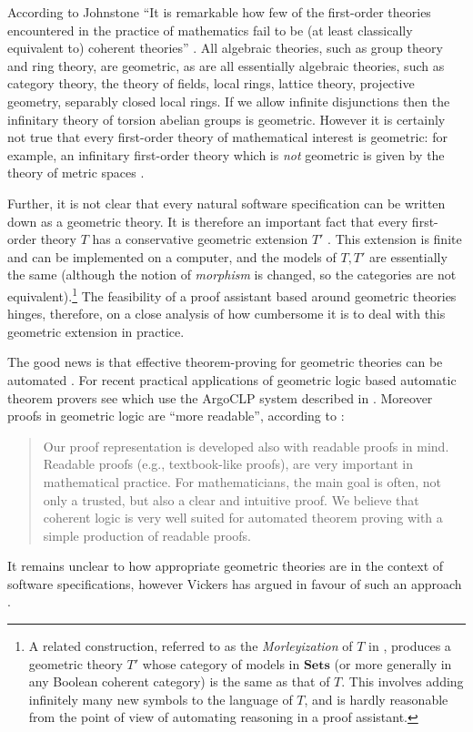 \documentclass[english,letter paper,12pt,reqno]{article}
\theoremstyle{example}
\begin{document}
According to Johnstone ``It is remarkable how few of the first-order theories encountered in the practice of mathematics fail to be (at least classically equivalent to) coherent theories'' \cite[\S D.1.1]{johnstone}. All algebraic theories, such as group theory and ring theory, are geometric, as are all essentially algebraic theories, such as category theory, the theory of fields, local rings, lattice theory, projective geometry, separably closed local rings. If we allow infinite disjunctions then the infinitary theory of torsion abelian groups is geometric. However it is certainly not true that every first-order theory of mathematical interest is geometric: for example, an infinitary first-order theory which is \emph{not} geometric is given by the theory of metric spaces \cite[Example 1.1.7(l)]{johnstone}.

Further, it is not clear that every natural software specification can be written down as a geometric theory. It is therefore an important fact that every first-order theory $T$ has a conservative geometric extension $T'$ \cite[Theorem 7.7]{negri}. This extension is finite and can be implemented on a computer, and the models of $T,T'$ are essentially the same (although the notion of \emph{morphism} is changed, so the categories are not equivalent).\footnote{A related construction, referred to as the \emph{Morleyization} of $T$ in \cite[D1.5.13]{johnstone}, produces a geometric theory $T'$ whose category of models in $\textbf{Sets}$ (or more generally in any Boolean coherent category) is the same as that of $T$. This involves adding infinitely many new symbols to the language of $T$, and is hardly reasonable from the point of view of automating reasoning in a proof assistant.} The feasibility of a proof assistant based around geometric theories hinges, therefore, on a close analysis of how cumbersome it is to deal with this geometric extension in practice.

The good news is that effective theorem-proving for geometric theories can be automated \cite{bezem, bezem2, bezem3, fisher, holen, nivelle, stojanovic}. For recent practical applications of geometric logic based automatic theorem provers see \cite{marinkovic, durdevic} which use the ArgoCLP system described in \cite{stojanovic}. Moreover proofs in geometric logic are ``more readable'', according to \cite{stojanovic2}:
\begin{quote}
Our proof representation is developed also with readable proofs in mind.
Readable proofs (e.g., textbook-like proofs), are very important in mathematical
practice. For mathematicians, the main goal is often, not only a trusted, but also
a clear and intuitive proof. We believe that coherent logic is very well suited for
automated theorem proving with a simple production of readable proofs.
\end{quote}
It remains unclear to how appropriate geometric theories are in the context of software specifications, however Vickers has argued in favour of such an approach \cite{vickers1,vickers2}.
\end{document}
